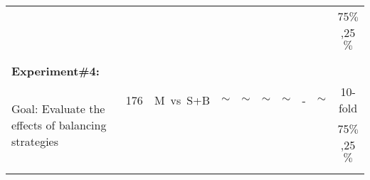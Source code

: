 \begin{landscape}
\begin{table}
\begin{center}
{\begin{tabular}{l  c	 c  c c  c  c  c  c   c  }
& & & & & &  & &  & 75$\%$,25$\%$\\
& & & & & & & & & \\
\\
\midrule
\textbf{Experiment\#4:} \\
\multirow{3}{5cm}{Goal: Evaluate the effects of balancing strategies} & 176 & M~vs~S+B & $\sim$ & $\sim$ & $\sim$ & $\sim$ & - & $\sim$ & 10-fold \\
& & & & & &  & &  & 75$\%$,25$\%$\\
& & & & & & & & & \\
\\
\midrule

\end{tabular}}
\end{center}
\label{tab:table3}
\end{table}
\end{landscape}
